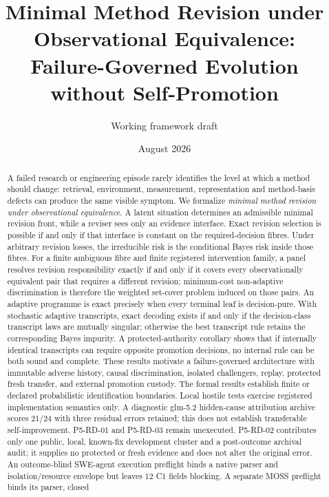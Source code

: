 \documentclass[11pt]{article}
\title{Minimal Method Revision under Observational Equivalence:\\
Failure-Governed Evolution without Self-Promotion}
\author{Working framework draft}
\date{August 2026}
\begin{document}
\maketitle

\begin{abstract}
A failed research or engineering episode rarely identifies the level at which a
method should change: retrieval, environment, measurement, representation and
method-basis defects can produce the same visible symptom. We formalize
\emph{minimal method revision under observational equivalence}. A latent
situation determines an admissible minimal revision front, while a reviser sees
only an evidence interface. Exact revision selection is possible if and only if
that interface is constant on the required-decision fibres. Under arbitrary
revision losses, the irreducible risk is the conditional Bayes risk inside
those fibres. For a finite ambiguous fibre and finite registered intervention
family, a panel resolves revision responsibility exactly if and only if it covers
every observationally equivalent pair that requires a different revision;
minimum-cost non-adaptive discrimination is therefore the weighted set-cover
problem induced on those pairs. An adaptive programme is exact precisely when
every terminal leaf is decision-pure. With stochastic adaptive transcripts,
exact decoding exists if and only if the decision-class transcript laws are
mutually singular; otherwise the best transcript rule retains the corresponding
Bayes impurity. A protected-authority corollary shows
that if internally identical transcripts can require opposite promotion
decisions, no internal rule can be both sound and complete. These results
motivate a failure-governed architecture with immutable adverse history,
causal discrimination, isolated challengers, replay, protected fresh transfer,
and external promotion custody. The formal results establish finite or declared
probabilistic identification boundaries. Local hostile tests exercise registered
implementation semantics only. A diagnostic glm-5.2 hidden-cause attribution
archive scores 21/24 with three residual errors retained; this does not establish
transferable self-improvement. P5-RD-01 and P5-RD-03 remain unexecuted.
P5-RD-02 contributes only one public, local, known-fix development cluster and
a post-outcome archival audit; it supplies no protected or fresh evidence and
does not alter the original error. An outcome-blind SWE-agent execution
preflight binds a native parser and isolation/resource envelope but leaves 12
C1 fields blocking. A separate MOSS preflight binds its parser, closed

\end{abstract}
\end{document}
